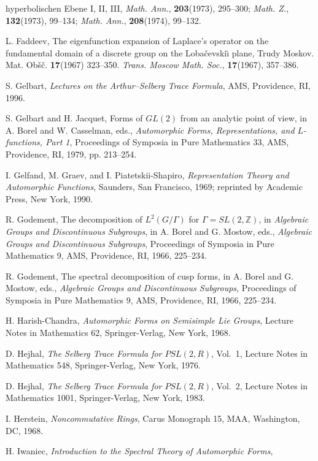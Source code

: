 \begin{enumerate}[label={[\arabic*]},leftmargin=2.8em,itemsep=0.35em,topsep=0.4em]
hyperbolischen Ebene I, II, III, \emph{Math. Ann.}, \textbf{203}(1973), 295--300;
\emph{Math. Z.}, \textbf{132}(1973), 99--134; \emph{Math. Ann.}, \textbf{208}(1974),
99--132.
\item L. Faddeev, The eigenfunction expansion of Laplace's operator on the fundamental
domain of a discrete group on the Loba\v{c}evski\u{\i} plane, Trudy Moskov. Mat.
Ob\v{s}\v{c}. \textbf{17}(1967) 323--350. \emph{Trans. Moscow Math. Soc.},
\textbf{17}(1967), 357--386.
\item S. Gelbart, \emph{Lectures on the Arthur--Selberg Trace Formula}, AMS,
Providence, RI, 1996.
\item S. Gelbart and H. Jacquet, Forms of $GL(2)$ from an analytic point of view,
in A. Borel and W. Casselman, eds., \emph{Automorphic Forms, Representations, and
$L$-functions, Part 1}, Proceedings of Symposia in Pure Mathematics 33, AMS,
Providence, RI, 1979, pp. 213--254.
\item I. Gelfand, M. Graev, and I. Piatetskii-Shapiro, \emph{Representation Theory
and Automorphic Functions}, Saunders, San Francisco, 1969; reprinted by Academic
Press, New York, 1990.
\item R. Godement, The decomposition of $L^{2}(G/\Gamma)$ for $\Gamma=SL(2,\mathbb{Z})$,
in \emph{Algebraic Groups and Discontinuous Subgroups}, in A. Borel and G. Mostow,
eds., \emph{Algebraic Groups and Discontinuous Subgroups}, Proceedings of Symposia in
Pure Mathematics 9, AMS, Providence, RI, 1966, 225--234.
\item R. Godement, The spectral decomposition of cusp forms, in A. Borel and
G. Mostow, eds., \emph{Algebraic Groups and Discontinuous Subgroups}, Proceedings of
Symposia in Pure Mathematics 9, AMS, Providence, RI, 1966, 225--234.
\item H. Harish-Chandra, \emph{Automorphic Forms on Semisimple Lie Groups}, Lecture
Notes in Mathematics 62, Springer-Verlag, New York, 1968.
\item D. Hejhal, \emph{The Selberg Trace Formula for $PSL(2,R)$}, Vol.\ 1, Lecture
Notes in Mathematics 548, Springer-Verlag, New York, 1976.
\item D. Hejhal, \emph{The Selberg Trace Formula for $PSL(2,R)$}, Vol.\ 2, Lecture
Notes in Mathematics 1001, Springer-Verlag, New York, 1983.
\item I. Herstein, \emph{Noncommutative Rings}, Carus Monograph 15, MAA, Washington,
DC, 1968.
\item H. Iwaniec, \emph{Introduction to the Spectral Theory of Automorphic Forms},

\end{enumerate}
